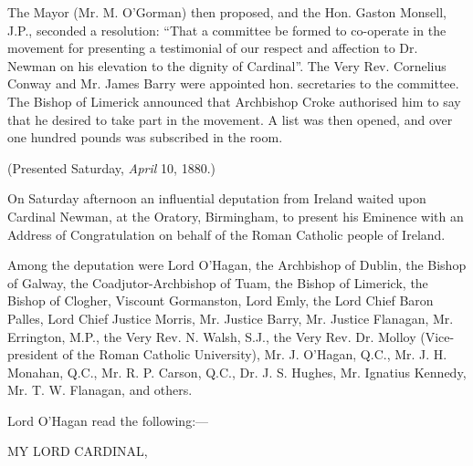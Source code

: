 The Mayor (Mr. M. O'Gorman) then proposed, and the Hon. Gaston
Monsell, J.P., seconded a resolution: ``That a committee be formed
to co-operate in the movement for presenting a testimonial of our
respect and affection to Dr. Newman on his elevation to the dignity of
Cardinal''. The Very Rev. Cornelius Conway and Mr. James Barry
were appointed hon. secretaries to the committee. The Bishop of
Limerick announced that Archbishop Croke authorised him to say that he
desired to take part in the movement. A list was then opened, and over
one hundred pounds was subscribed in the room.


(Presented Saturday, \emph{April} 10, 1880.)

On Saturday afternoon an influential deputation from Ireland waited
upon Cardinal Newman, at the Oratory, Birmingham, to present his
Eminence with an Address of Congratulation on behalf of the Roman
Catholic people of Ireland.

Among the deputation were Lord O'Hagan, the Archbishop of Dublin,
the Bishop of Galway, the Coadjutor-Archbishop of Tuam, the Bishop of
Limerick, the Bishop of Clogher, Viscount Gormanston, Lord Emly, the
Lord Chief Baron Palles, Lord Chief Justice Morris, Mr. Justice Barry,
Mr. Justice Flanagan, Mr. Errington, M.P., the Very Rev. N. Walsh, S.J.,
the Very Rev. Dr. Molloy (Vice-president of the Roman Catholic
University), Mr. J. O'Hagan, Q.C., Mr. J. H. Monahan, Q.C., Mr. R. P.
Carson, Q.C., Dr. J. S. Hughes, Mr. Ignatius Kennedy, Mr. T. W.
Flanagan, and others.

Lord O'Hagan read the following:—

MY LORD CARDINAL,

